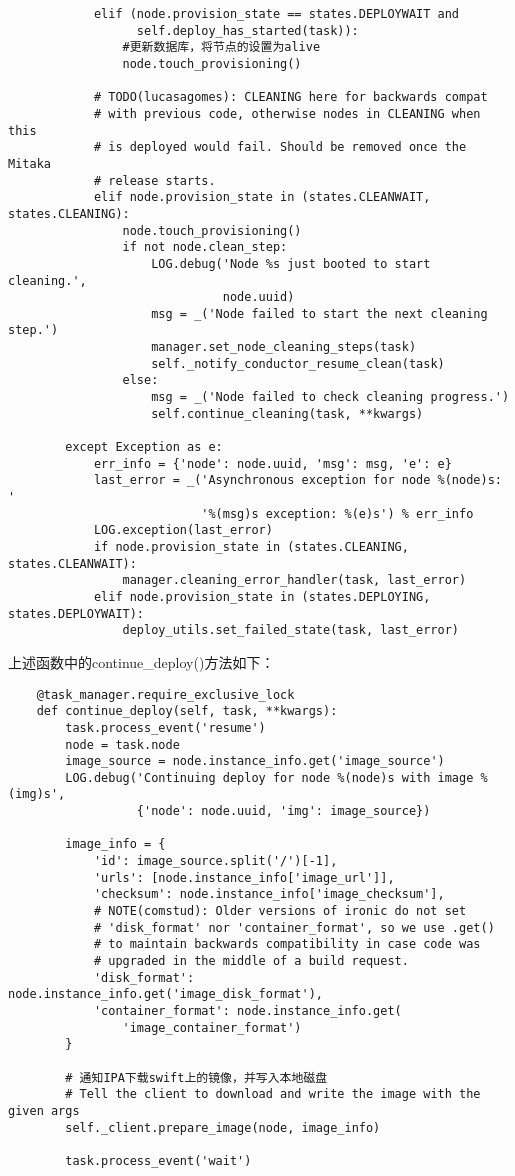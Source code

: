 \documentclass[a4paper,left=1.5cm,right=1.5cm,11pt]{article}
\begin{document}
\begin{lstlisting}
            elif (node.provision_state == states.DEPLOYWAIT and
                  self.deploy_has_started(task)):
				#更新数据库，将节点的设置为alive
                node.touch_provisioning()  

            # TODO(lucasagomes): CLEANING here for backwards compat
            # with previous code, otherwise nodes in CLEANING when this
            # is deployed would fail. Should be removed once the Mitaka
            # release starts.
            elif node.provision_state in (states.CLEANWAIT, states.CLEANING):
                node.touch_provisioning()
                if not node.clean_step:
                    LOG.debug('Node %s just booted to start cleaning.',
                              node.uuid)
                    msg = _('Node failed to start the next cleaning step.')
                    manager.set_node_cleaning_steps(task)
                    self._notify_conductor_resume_clean(task)
                else:
                    msg = _('Node failed to check cleaning progress.')
                    self.continue_cleaning(task, **kwargs)

        except Exception as e:
            err_info = {'node': node.uuid, 'msg': msg, 'e': e}
            last_error = _('Asynchronous exception for node %(node)s: '
                           '%(msg)s exception: %(e)s') % err_info
            LOG.exception(last_error)
            if node.provision_state in (states.CLEANING, states.CLEANWAIT):
                manager.cleaning_error_handler(task, last_error)
            elif node.provision_state in (states.DEPLOYING, states.DEPLOYWAIT):
                deploy_utils.set_failed_state(task, last_error)
	\end{lstlisting}

	上述函数中的continue\_deploy()方法如下：
	\begin{lstlisting}
	@task_manager.require_exclusive_lock
    def continue_deploy(self, task, **kwargs):
        task.process_event('resume')
        node = task.node
        image_source = node.instance_info.get('image_source')
        LOG.debug('Continuing deploy for node %(node)s with image %(img)s',
                  {'node': node.uuid, 'img': image_source})

        image_info = {
            'id': image_source.split('/')[-1],
            'urls': [node.instance_info['image_url']],
            'checksum': node.instance_info['image_checksum'],
            # NOTE(comstud): Older versions of ironic do not set
            # 'disk_format' nor 'container_format', so we use .get()
            # to maintain backwards compatibility in case code was
            # upgraded in the middle of a build request.
            'disk_format': node.instance_info.get('image_disk_format'),
            'container_format': node.instance_info.get(
                'image_container_format')
        }

        # 通知IPA下载swift上的镜像，并写入本地磁盘
        # Tell the client to download and write the image with the given args
        self._client.prepare_image(node, image_info)

        task.process_event('wait')
	\end{lstlisting}
\end{document}
